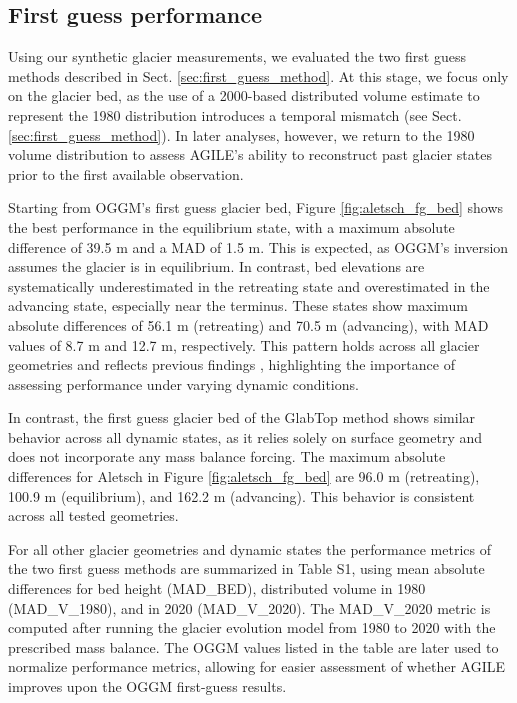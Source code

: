 \documentclass[journal abbreviation, manuscript]{copernicus}
\begin{document}
\subsection{First guess performance}
\label{sec:first_guess_performance}

Using our synthetic glacier measurements, we evaluated the two first guess methods described in Sect. \ref{sec:first_guess_method}. At this stage, we focus only on the glacier bed, as the use of a 2000-based distributed volume estimate to represent the 1980 distribution introduces a temporal mismatch (see Sect. \ref{sec:first_guess_method}). In later analyses, however, we return to the 1980 volume distribution to assess AGILE’s ability to reconstruct past glacier states prior to the first available observation.

Starting from OGGM’s first guess glacier bed, Figure \ref{fig:aletsch_fg_bed} shows the best performance in the equilibrium state, with a maximum absolute difference of 39.5 m and a MAD of 1.5 m. This is expected, as OGGM’s inversion assumes the glacier is in equilibrium. In contrast, bed elevations are systematically underestimated in the retreating state and overestimated in the advancing state, especially near the terminus. These states show maximum absolute differences of 56.1 m (retreating) and 70.5 m (advancing), with MAD values of 8.7 m and 12.7 m, respectively. This pattern holds across all glacier geometries and reflects previous findings \citep[e.g., Figure 5, panel d in][]{Maussion2019}, highlighting the importance of assessing performance under varying dynamic conditions.

In contrast, the first guess glacier bed of the GlabTop method shows similar behavior across all dynamic states, as it relies solely on surface geometry and does not incorporate any mass balance forcing. The maximum absolute differences for Aletsch in Figure \ref{fig:aletsch_fg_bed} are 96.0 m (retreating), 100.9 m (equilibrium), and 162.2 m (advancing). This behavior is consistent across all tested geometries.

For all other glacier geometries and dynamic states the performance metrics of the two first guess methods are summarized in Table S1, using mean absolute differences for bed height (MAD\_BED), distributed volume in 1980 (MAD\_V\_1980), and in 2020 (MAD\_V\_2020). The MAD\_V\_2020 metric is computed after running the glacier evolution model from 1980 to 2020 with the prescribed mass balance. The OGGM values listed in the table are later used to normalize performance metrics, allowing for easier assessment of whether AGILE improves upon the OGGM first-guess results.
\end{document}

